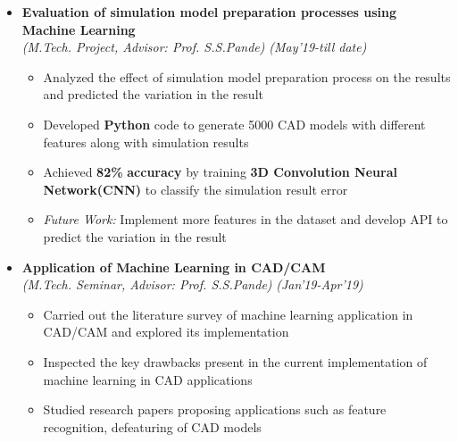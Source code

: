 \documentclass[a4paper,10pt]{article}
\begin{document}
\begin{itemize}%
\item \textbf{Evaluation of simulation model preparation processes using Machine Learning}\\
\emph{(M.Tech. Project, Advisor: Prof. S.S.Pande)} \hfill \emph{(May'19-till date)}
	\begin{itemize}[noitemsep,nolistsep]
	\item Analyzed the effect of simulation model preparation process on the results and predicted the variation in the result
	\item Developed \textbf{Python} code to generate 5000 CAD models with different features along with simulation results
	\item Achieved \textbf{82\%} \textbf{accuracy} by training \textbf{3D Convolution Neural Network(CNN)} to classify the simulation result error
	\item \textit{Future Work:} Implement more features in the dataset and develop API to predict the variation in the result
    \end{itemize}
    
\item \textbf{Application of Machine Learning in CAD/CAM} \\
\emph{(M.Tech. Seminar, Advisor: Prof. S.S.Pande)} \hfill \emph{(Jan'19-Apr'19)}
	\begin{itemize}[noitemsep,nolistsep]
    \item Carried out the literature survey of machine learning application in CAD/CAM and explored its implementation %
    \item Inspected the key drawbacks present in the current implementation of machine learning in CAD applications
    \item Studied research papers proposing applications such as feature recognition, defeaturing of CAD models
	\end{itemize}
	
\end{itemize}
\end{document}
